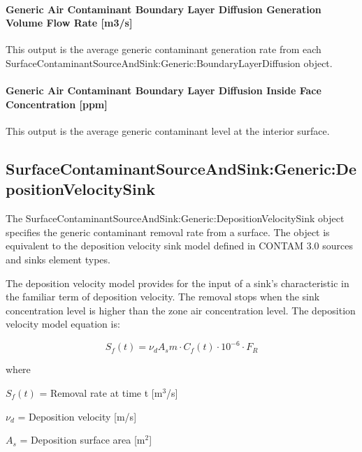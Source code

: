 \paragraph{Generic Air Contaminant Boundary Layer Diffusion Generation Volume Flow Rate {[}m3/s{]}}\label{generic-air-contaminant-boundary-layer-diffusion-generation-volume-flow-rate-m3s}

This output is the average generic contaminant generation rate from each Sur\-face\-Contaminant\-Source\-And\-Sink:\-Generic:\-Boundary\-Layer\-Diffusion object.

\paragraph{Generic Air Contaminant Boundary Layer Diffusion Inside Face Concentration {[}ppm{]}}\label{generic-air-contaminant-boundary-layer-diffusion-inside-face-concentration-ppm}

This output is the average generic contaminant level at the interior surface.

\subsection{Sur\-face\-Contaminant\-Source\-And\-Sink:\-Generic:\-Deposition\-Velocity\-Sink}\label{surfacecontaminantsourceandsinkgenericdepositionvelocitysink}

The Sur\-face\-Contaminant\-Source\-And\-Sink:\-Generic:\-Deposition\-Velocity\-Sink object specifies the generic contaminant removal rate from a surface. The object is equivalent to the deposition velocity sink model defined in CONTAM 3.0 sources and sinks element types.

The deposition velocity model provides for the input of a sink's characteristic in the familiar term of deposition velocity. The removal stops when the sink concentration level is higher than the zone air concentration level. The deposition velocity model equation is:

\begin{equation}
{S_f}(t) = {\nu_d}{A_s}m \cdot {C_f}(t)\cdot 10^{-6} \cdot F{}_R
\end{equation}

where

\(S_f (t)\) = Removal rate at time t {[}m\(^{3}\)/s{]}

\(\nu_d\) = Deposition velocity {[}m/s{]}

\(A_s\) = Deposition surface area {[}m\(^{2}\){]}


